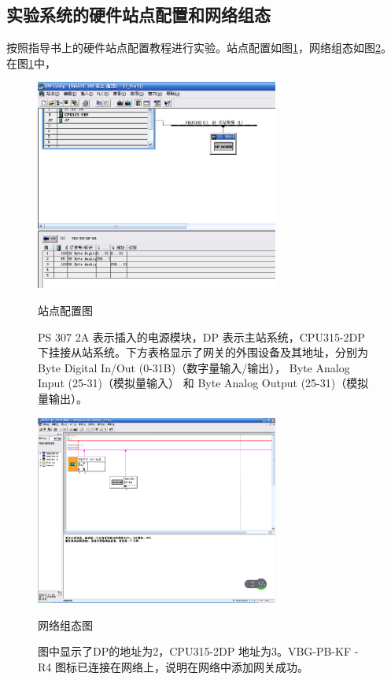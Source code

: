 \subsection{实验系统的硬件站点配置和网络组态}
按照指导书上的硬件站点配置教程进行实验。站点配置如图\ref{fig:hard_conf}，网络组态如图\ref{fig:net_org}。
在图\ref{fig:hard_conf}中，

\begin{figure}[htbp]
\centering
\includegraphics[width=8cm]{resource/hard_config.png}
\caption{站点配置图}
\caption*{\small{\ttfamily PS 307 2A} 表示插入的电源模块，{\ttfamily DP} 表示主站系统，{\ttfamily CPU315-2DP} 下挂接从站系统。下方表格显示了网关的外围设备及其地址，分别为{ Byte Digital In/Out (0-31B)}（数字量输入/输出），{ Byte Analog Input (25-31)}（模拟量输入） 和 { Byte Analog Output (25-31)}（模拟量输出）。}
\label{fig:hard_conf}
\end{figure}

\begin{figure}[htbp]
\centering
\includegraphics[width=8cm]{resource/net_organize.png}
\caption{网络组态图}
\caption*{\small 图中显示了{\ttfamily DP}的地址为2，{\ttfamily CPU315-2DP} 地址为3。{\ttfamily VBG-PB-KF -R4} 图标已连接在网络上，说明在网络中添加网关成功。}
\label{fig:net_org}
\end{figure}

